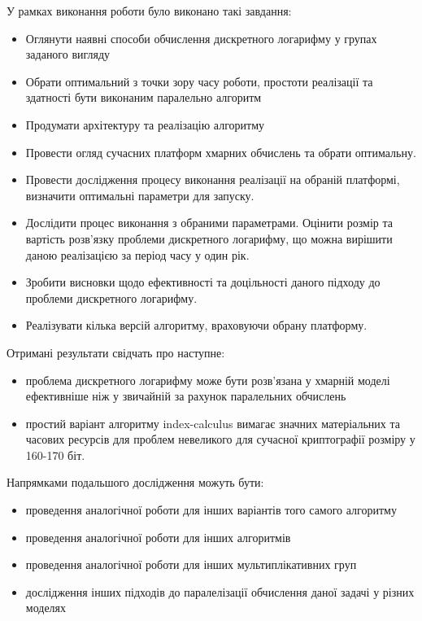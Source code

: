 \conclusions

У рамках виконання роботи було виконано такі завдання:

\begin{itemize}
\item Оглянути наявні способи обчислення дискретного логарифму у групах заданого вигляду
\item Обрати оптимальний з точки зору часу роботи, простоти реалізації та здатності бути виконаним паралельно алгоритм
\item Продумати архітектуру та реалізацію алгоритму
\item Провести огляд сучасних платформ хмарних обчислень та обрати оптимальну.
\item Провести дослідження процесу виконання реалізації на обраній платформі, визначити оптимальні параметри для запуску.
\item Дослідити процес виконання з обраними параметрами. Оцінити розмір та вартість розв'язку проблеми дискретного логарифму, що можна вирішити даною реалізацією за період часу у один рік.
\item Зробити висновки щодо ефективності та доцільності даного підходу до проблеми дискретного логарифму.

\item Реалізувати кілька версій алгоритму, враховуючи обрану платформу.
\end{itemize}

Отримані результати свідчать про наступне:

\begin{itemize}
\item проблема дискретного логарифму може бути розв'язана у хмарній моделі ефективніше ніж у звичайній за рахунок паралельних обчислень
\item простий варіант алгоритму index-calculus вимагає значних матеріальних та часових ресурсів для проблем невеликого для сучасної криптографії розміру у 160-170 біт.
\end{itemize}

Напрямками подальшого дослідження можуть бути:

\begin{itemize}
\item проведення аналогічної роботи для інших варіантів того самого алгоритму
\item проведення аналогічної роботи для інших алгоритмів
\item проведення аналогічної роботи для інших мультиплікативних груп
\item дослідження інших підходів до паралелізації обчислення даної задачі у різних моделях
\end{itemize}